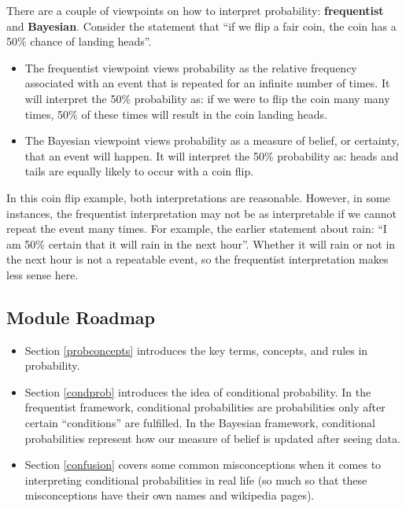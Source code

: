\documentclass[
]{book}
\providecommand{\tightlist}{%
  \setlength{\itemsep}{0pt}\setlength{\parskip}{0pt}}
\begin{document}
There are a couple of viewpoints on how to interpret probability: \textbf{frequentist} and \textbf{Bayesian}. Consider the statement that ``if we flip a fair coin, the coin has a 50\% chance of landing heads''.

\begin{itemize}
\item
  The frequentist viewpoint views probability as the relative frequency associated with an event that is repeated for an infinite number of times. It will interpret the 50\% probability as: if we were to flip the coin many many times, 50\% of these times will result in the coin landing heads.
\item
  The Bayesian viewpoint views probability as a measure of belief, or certainty, that an event will happen. It will interpret the 50\% probability as: heads and tails are equally likely to occur with a coin flip.
\end{itemize}

In this coin flip example, both interpretations are reasonable. However, in some instances, the frequentist interpretation may not be as interpretable if we cannot repeat the event many times. For example, the earlier statement about rain: ``I am 50\% certain that it will rain in the next hour''. Whether it will rain or not in the next hour is not a repeatable event, so the frequentist interpretation makes less sense here.

\hypertarget{module-roadmap}{%
\subsection{Module Roadmap}\label{module-roadmap}}

\begin{itemize}
\tightlist
\item
  Section \ref{probconcepts} introduces the key terms, concepts, and rules in probability.
\item
  Section \ref{condprob} introduces the idea of conditional probability. In the frequentist framework, conditional probabilities are probabilities only after certain ``conditions'' are fulfilled. In the Bayesian framework, conditional probabilities represent how our measure of belief is updated after seeing data.
\item
  Section \ref{confusion} covers some common misconceptions when it comes to interpreting conditional probabilities in real life (so much so that these misconceptions have their own names and wikipedia pages).
\end{itemize}
\end{document}
